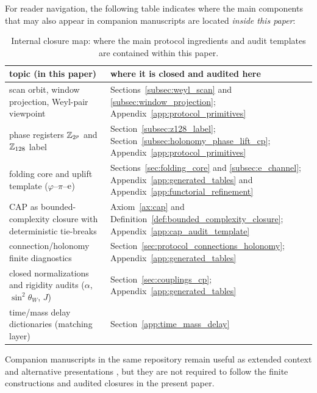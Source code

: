 For reader navigation, the following table indicates where the main components that may also appear in companion manuscripts are located \emph{inside this paper}:
\begin{table}[t]
\centering
\scriptsize
\setlength{\tabcolsep}{6pt}
\renewcommand{\arraystretch}{1.15}
\begin{tabular}{p{} p{}}
\toprule
topic (in this paper) & where it is closed and audited here \\
\midrule
scan orbit, window projection, Weyl-pair viewpoint & Sections~\ref{subsec:weyl_scan} and \ref{subsec:window_projection}; Appendix~\ref{app:protocol_primitives} \\
phase registers $\mathbb{Z}_{2^p}$ and \texorpdfstring{$\mathbb{Z}_{128}$}{Z128} label & Section~\ref{subsec:z128_label}; Section~\ref{subsec:holonomy_phase_lift_cp}; Appendix~\ref{app:protocol_primitives} \\
folding core and uplift template ($\varphi$--$\pi$--$\mathrm{e}$) & Sections~\ref{sec:folding_core} and \ref{subsec:e_channel}; Appendix~\ref{app:generated_tables} and Appendix~\ref{app:functorial_refinement} \\
CAP as bounded-complexity closure with deterministic tie-breaks & Axiom~\ref{ax:cap} and Definition~\ref{def:bounded_complexity_closure}; Appendix~\ref{app:cap_audit_template} \\
connection/holonomy finite diagnostics & Section~\ref{sec:protocol_connections_holonomy}; Appendix~\ref{app:generated_tables} \\
closed normalizations and rigidity audits ($\alpha$, $\sin^2\theta_W$, $J$) & Section~\ref{sec:couplings_cp}; Appendix~\ref{app:generated_tables} \\
time/mass delay dictionaries (matching layer) & Section~\ref{app:time_mass_delay} \\
\bottomrule
\end{tabular}
\caption{Internal closure map: where the main protocol ingredients and audit templates are contained within this paper.}
\label{tab:internal_closure_map}
\end{table}

Companion manuscripts in the same repository remain useful as extended context and alternative presentations \cite{Ma2025HPA,Ma2025CAP,Ma2025CAPII,Ma2025HHU,Ma2025HPT,Ma2025PCG,Ma2025RF,Ma2025HPOT,Ma2025FoP}, but they are not required to follow the finite constructions and audited closures in the present paper.

